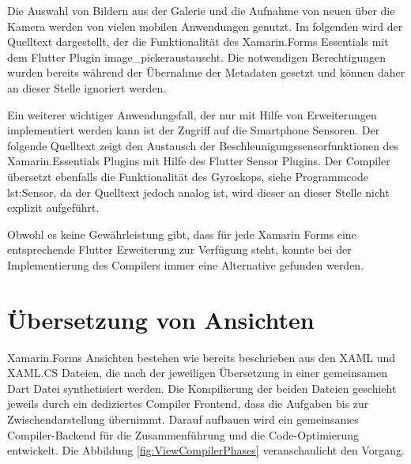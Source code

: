 Die Auswahl von Bildern aus der Galerie und die Aufnahme von neuen über die Kamera werden von vielen mobilen Anwendungen genutzt.  Im folgenden wird der Quelltext dargestellt, der die Funktionalität des Xamarin.Forms Essentials mit dem Flutter Plugin \glq image\_picker\grq austauscht.  Die notwendigen Berechtigungen wurden bereits während der Übernahme der Metadaten gesetzt und können daher an dieser Stelle ignoriert werden.



Ein weiterer wichtiger Anwendungsfall,  der nur mit Hilfe von Erweiterungen implementiert werden kann ist der Zugriff auf die Smartphone Sensoren.  Der folgende Quelltext zeigt den Austausch der Beschleunigungssensorfunktionen des Xamarin.Essentials Plugins mit Hilfe des Flutter Sensor Plugins.  Der Compiler übersetzt ebenfalls die Funktionalität des Gyroskops, siehe Programmcode {lst:Sensor},  da der Quelltext jedoch analog ist, wird dieser an dieser Stelle nicht explizit aufgeführt. 



 Obwohl es keine Gewährleistung gibt, dass für jede Xamarin Forms eine entsprechende Flutter 
Erweiterung zur Verfügung steht, konnte bei der Implementierung des Compilers immer eine  Alternative gefunden werden.


\section{Übersetzung von Ansichten}
Xamarin.Forms Ansichten bestehen wie bereits beschrieben aus den XAML und XAML.CS Dateien, die nach der jeweiligen Übersetzung  in einer gemeinsamen Dart Datei synthetisiert werden.  
Die Kompilierung der beiden Dateien geschieht jeweils durch ein dediziertes Compiler Frontend, dass die Aufgaben bis zur Zwischendarstellung übernimmt.  Darauf aufbauen wird ein gemeinsames Compiler-Backend für die Zusammenführung und die Code-Optimierung entwickelt.  Die Abbildung  \ref{fig:ViewCompilerPhases} veranschaulicht den Vorgang. 


